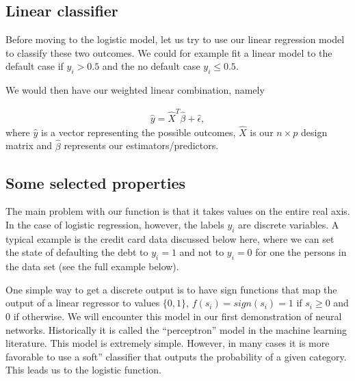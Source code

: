 \documentclass[letterpaper,10pt,english]{sphinxmanual}
\begin{document}
\subsection{Linear classifier}
\label{\detokenize{chapter5:linear-classifier}}
Before moving to the logistic model, let us try to use our linear
regression model to classify these two outcomes. We could for example
fit a linear model to the default case if \(y_i > 0.5\) and the no
default case \(y_i \leq 0.5\).

We would then have our
weighted linear combination, namely




\begin{equation*}
\begin{split}
\begin{equation}
\hat{y} = \hat{X}^T\hat{\beta} +  \hat{\epsilon},
\label{_auto1} \tag{1}
\end{equation}
\end{split}
\end{equation*}
where \(\hat{y}\) is a vector representing the possible outcomes, \(\hat{X}\) is our
\(n\times p\) design matrix and \(\hat{\beta}\) represents our estimators/predictors.


\subsection{Some selected properties}
\label{\detokenize{chapter5:some-selected-properties}}
The main problem with our function is that it takes values on the
entire real axis. In the case of logistic regression, however, the
labels \(y_i\) are discrete variables. A typical example is the credit
card data discussed below here, where we can set the state of
defaulting the debt to \(y_i=1\) and not to \(y_i=0\) for one the persons
in the data set (see the full example below).

One simple way to get a discrete output is to have sign
functions that map the output of a linear regressor to values \(\{0,1\}\),
\(f(s_i)=sign(s_i)=1\) if \(s_i\ge 0\) and 0 if otherwise.
We will encounter this model in our first demonstration of neural networks. Historically it is called the “perceptron” model in the machine learning
literature. This model is extremely simple. However, in many cases it is more
favorable to use a \textasciigrave{}\textasciigrave{}soft” classifier that outputs
the probability of a given category. This leads us to the logistic function.
\end{document}
